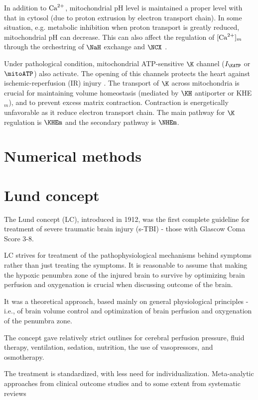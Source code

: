 In addition to ${\text{Ca}^{2+}}$, mitochondrial pH level is maintained a proper level with
that in cytosol \citep{baysal1991} (due to proton extrusion by electron
transport chain).
In some situation, e.g. metabolic inhibition when proton transport is greatly
reduced, mitochondrial pH can decrease. This can also affect the regulation of
$[{\text{Ca}^{2+}}]_m$ through the orchestring of $\NaH$ exchange and $\NCX$
\citep{baysal1991,nguyen2007}.

Under pathological condition, mitochondrial ATP-sensitive $\K$ channel
($I_\KATP$ or $\mitoATP$) also activate. The opening of this channels protects
the heart against ischemic-reperfusion (IR) injury \citep{kowaltowski2001,
garlid2003}. The transport of $\K$ across mitochondria is crucial for
maintaining volume homeostasis (mediated by $\KH$ antiporter or KHE$_m$), and to
prevent excess matrix contraction. Contraction is energetically unfavorable as it
reduce electron transport chain. The main pathway for $\K$ regulation is $\KHEm$
and the secondary pathway is $\NHEm$.

\section{Numerical methods}


\section{Lund concept}
\label{sec:Lund-concept}


The Lund concept (LC), introduced in 1912, was the first complete guideline for
treatment of severe traumatic brain injury (s-TBI) - those with Glascow Coma
Score 3-8.

LC strives for treatment of the pathophysiological mechanisms behind symptoms
rather than just treating the symptoms.
It is reasonable to assume that making the hypoxic penumbra zone of the injured
brain to survive by optimizing brain perfusion and oxygenation is crucial when
discussing outcome of the brain.  

 
It was a theoretical approach, based mainly on general physiological
principles - i.e., of brain volume control and optimization of brain perfusion and
oxygenation of the penumbra zone.

The concept gave relatively strict outlines for cerebral perfusion pressure,
fluid therapy, ventilation, sedation, nutrition, the use of vasopressors, and
osmotherapy.

The treatment is standardized, with less need for individualization.
Meta-analytic approaches from clinical outcome studies and to some extent from
systematic reviews



